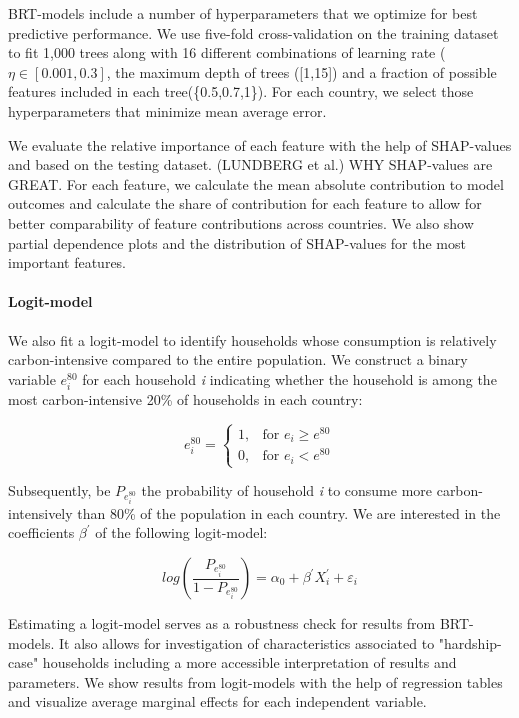 \documentclass[12pt, a4paper]{article}
\begin{document}
BRT-models include a number of hyperparameters that we optimize for best predictive performance. We use five-fold cross-validation on the training dataset to fit 1,000 trees along with 16 different combinations of learning rate ($\eta \in [0.001,0.3]$, the maximum depth of trees ([1,15]) and a fraction of possible features included in each tree(\{0.5,0.7,1\}). For each country, we select those hyperparameters that minimize mean average error.

We evaluate the relative importance of each feature with the help of SHAP-values and based on the testing dataset. (LUNDBERG et al.) WHY SHAP-values are GREAT. For each feature, we calculate the mean absolute contribution to model outcomes and calculate the share of contribution for each feature to allow for better comparability of feature contributions across countries. We also show partial dependence plots and the distribution of SHAP-values for the most important features.

\paragraph{Logit-model} We also fit a logit-model to identify households whose consumption is relatively carbon-intensive compared to the entire population. We construct a binary variable $e_{i}^{80}$ for each household \textit{i} indicating whether the household is among the most carbon-intensive 20\% of households in each country:

\begin{equation}
    e_{i}^{80} =
    \begin{cases}
    1, & \text{for }  e_{i} \geq e^{80} \\
    0, & \text{for }  e_{i} < e^{80}
    \end{cases}
\end{equation}

Subsequently, be $P_{e_{i}^{80}}$ the probability of household \textit{i} to consume more carbon-intensively than 80\% of the population in each country. We are interested in the coefficients $\beta^{'}$ of the following logit-model:

\begin{equation}
    log \left( \frac{P_{e_{i}^{80}}}{1 - P_{e_{i}^{80}}} \right) = \alpha_{0} + \beta^{'} X_{i}^{'} + \varepsilon_{i}
\end{equation}

Estimating a logit-model serves as a robustness check for results from BRT-models. It also allows for investigation of characteristics associated to "hardship-case" households including a more accessible interpretation of results and parameters. We show results from logit-models with the help of regression tables and visualize average marginal effects for each independent variable.
\end{document}
